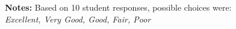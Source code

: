 \begin{boenumerate}
\begin{itemize}
\begin{figure}[h!]\centering
{}\hspace{0.75cm}
\begin{center}
\begin{minipage}[t]{0.85\columnwidth}\vspace{-0.75cm}
\item\scriptsize{\textbf{Notes:} Based on 10 student responses, possible choices were: \emph{Excellent, Very Good, Good, Fair, Poor} }
\end{minipage}
\end{center}
\end{figure}
\FloatBarrier








\end{itemize}
\end{boenumerate}
